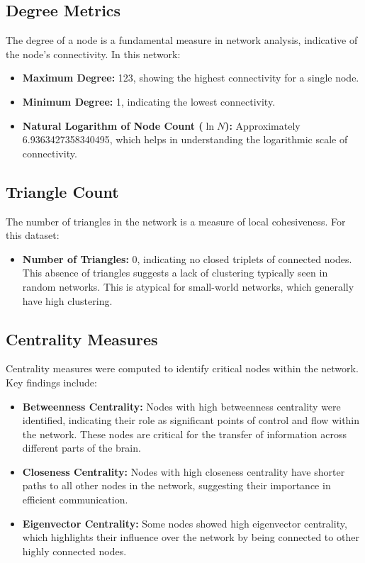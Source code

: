 \documentclass[
	report, %
	11pt, %
]{CSUniSchoolLabReport}
\begin{document}
	\subsection{Degree Metrics}

	The degree of a node is a fundamental measure in network analysis, indicative of the node's connectivity. In this network:
	\vspace{10pt}

	\begin{itemize}
		\item \textbf{Maximum Degree:} 123, showing the highest connectivity for a single node.
		\item \textbf{Minimum Degree:} 1, indicating the lowest connectivity.
		\item \textbf{Natural Logarithm of Node Count (\(\ln N\)):} Approximately \num{6.9363427358340495}, which helps in understanding the logarithmic scale of connectivity.
	\end{itemize}


	\subsection{Triangle Count}

	The number of triangles in the network is a measure of local cohesiveness. For this dataset:
	\begin{itemize}
		\item \textbf{Number of Triangles:} 0, indicating no closed triplets of connected nodes. This absence of triangles suggests a lack of clustering typically seen in random networks. This is atypical for small-world networks, which generally have high clustering.
	\end{itemize}

	\subsection{Centrality Measures}

	Centrality measures were computed to identify critical nodes within the network. Key findings include:
	\vspace{10pt}


	\begin{itemize}
		\item \textbf{Betweenness Centrality:} Nodes with high betweenness centrality were identified, indicating their role as significant points of control and flow within the network. These nodes are critical for the transfer of information across different parts of the brain.
		\item \textbf{Closeness Centrality:} Nodes with high closeness centrality have shorter paths to all other nodes in the network, suggesting their importance in efficient communication.
		\item \textbf{Eigenvector Centrality:} Some nodes showed high eigenvector centrality, which highlights their influence over the network by being connected to other highly connected nodes.
	\end{itemize}
\end{document}
